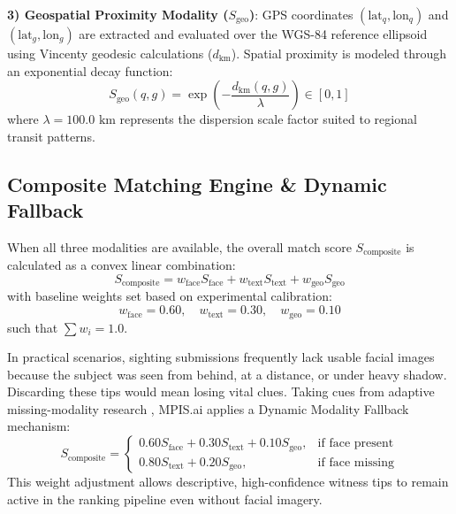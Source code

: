 \documentclass[conference]{IEEEtran}
\begin{document}
\textbf{3) Geospatial Proximity Modality ($S_{\text{geo}}$)}: GPS coordinates $(\text{lat}_q, \text{lon}_q)$ and $(\text{lat}_g, \text{lon}_g)$ are extracted and evaluated over the WGS-84 reference ellipsoid using Vincenty geodesic calculations ($d_{\text{km}}$). Spatial proximity is modeled through an exponential decay function:
\begin{equation}
S_{\text{geo}}(q, g) = \exp\left(-\frac{d_{\text{km}}(q, g)}{\lambda}\right) \in [0, 1]
\end{equation}
where $\lambda = 100.0\text{ km}$ represents the dispersion scale factor suited to regional transit patterns.

\subsection{Composite Matching Engine \& Dynamic Fallback}
When all three modalities are available, the overall match score $S_{\text{composite}}$ is calculated as a convex linear combination:
\begin{equation}
S_{\text{composite}} = w_{\text{face}} S_{\text{face}} + w_{\text{text}} S_{\text{text}} + w_{\text{geo}} S_{\text{geo}}
\end{equation}
with baseline weights set based on experimental calibration:
\begin{equation}
w_{\text{face}} = 0.60, \quad w_{\text{text}} = 0.30, \quad w_{\text{geo}} = 0.10
\end{equation}
such that $\sum w_i = 1.0$.

In practical scenarios, sighting submissions frequently lack usable facial images because the subject was seen from behind, at a distance, or under heavy shadow. Discarding these tips would mean losing vital clues. Taking cues from adaptive missing-modality research \cite{ref_paper5_adaptive}, MPIS.ai applies a Dynamic Modality Fallback mechanism:
\begin{equation}
S_{\text{composite}} = 
\begin{cases}
0.60 S_{\text{face}} + 0.30 S_{\text{text}} + 0.10 S_{\text{geo}}, & \text{if face present} \\
0.80 S_{\text{text}} + 0.20 S_{\text{geo}}, & \text{if face missing}
\end{cases}
\end{equation}
This weight adjustment allows descriptive, high-confidence witness tips to remain active in the ranking pipeline even without facial imagery.

\end{document}
